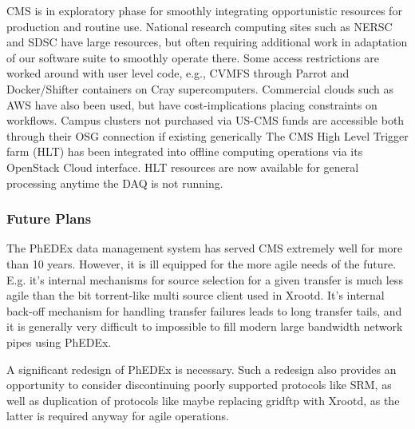 \documentclass[11pt,a4paper]{article}
\begin{document}

CMS is in exploratory phase for smoothly integrating opportunistic
resources for production and routine use. National research computing
sites such as NERSC and SDSC have large resources, but often requiring
additional work in adaptation of our software suite to smoothly
operate there. Some access restrictions are worked around with user
level code, e.g., CVMFS through Parrot and Docker/Shifter containers
on Cray supercomputers. Commercial clouds such as AWS have also been
used, but have cost-implications placing constraints on workflows.  
Campus clusters not purchased via US-CMS funds are accessible both
through their OSG connection if existing generically
The CMS High Level Trigger farm (HLT) has been integrated into offline computing operations
via its OpenStack Cloud interface. HLT resources are now available for general processing anytime the
DAQ is not running.


\subsubsection{Future Plans}

The PhEDEx data management system has served CMS extremely well for more than 10 years.
However, it is ill equipped for the more agile needs of the future. E.g. it's internal mechanisms for
source selection for a given transfer is much less agile than the bit torrent-like multi source client
used in Xrootd. It's internal back-off mechanism for handling transfer failures leads to long transfer
tails, and it is generally very difficult to impossible to fill modern large bandwidth network pipes using PhEDEx.

A significant redesign of PhEDEx is necessary. 
Such a redesign also provides an opportunity to consider discontinuing poorly supported protocols like SRM, 
as well as duplication of protocols like maybe replacing gridftp with Xrootd, as the latter is required anyway
for agile operations.
\end{document}
